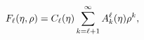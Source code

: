 \[\mathop{F_{\ell}\/}\nolimits\!\left(\eta,\rho\right)=\mathop{C_{\ell}\/}%
\nolimits\!\left(\eta\right)\sum_{k=\ell+1}^{\infty}A_{k}^{\ell}(\eta)\rho^{k},\]